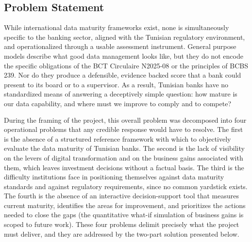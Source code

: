 \subsection{Problem Statement}

While international data maturity frameworks exist, none is simultaneously specific to the banking sector, aligned with the Tunisian regulatory environment, and operationalized through a usable assessment instrument. General purpose models describe what good data management looks like, but they do not encode the specific obligations of the BCT Circulaire N\textdegree{}2025-08 or the principles of BCBS 239. Nor do they produce a defensible, evidence backed score that a bank could present to its board or to a supervisor. As a result, Tunisian banks have no standardized means of answering a deceptively simple question: how mature is our data capability, and where must we improve to comply and to compete?

During the framing of the project, this overall problem was decomposed into four operational problems that any credible response would have to resolve. The first is the absence of a structured reference framework with which to objectively evaluate the data maturity of Tunisian banks. The second is the lack of visibility on the levers of digital transformation and on the business gains associated with them, which leaves investment decisions without a factual basis. The third is the difficulty institutions face in positioning themselves against data maturity standards and against regulatory requirements, since no common yardstick exists. The fourth is the absence of an interactive decision-support tool that measures current maturity, identifies the areas for improvement, and prioritizes the actions needed to close the gaps (the quantitative what-if simulation of business gains is scoped to future work). These four problems delimit precisely what the project must deliver, and they are addressed by the two-part solution presented below.

